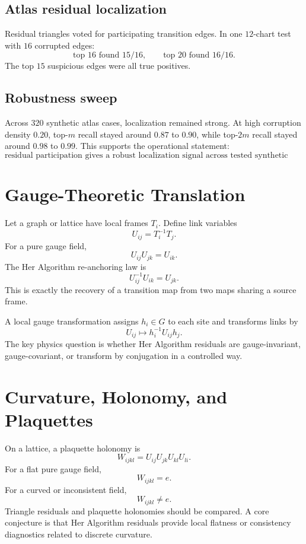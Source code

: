 \documentclass[11pt]{article}
\newcommand{\HA}{Her Algorithm}
\begin{document}
\subsection{Atlas residual localization}
Residual triangles voted for participating transition edges. In one \(12\)-chart test with \(16\) corrupted edges:
\[
\text{top }16\text{ found }15/16,\qquad \text{top }20\text{ found }16/16.
\]
The top \(15\) suspicious edges were all true positives.

\subsection{Robustness sweep}
Across \(320\) synthetic atlas cases, localization remained strong. At high corruption density \(0.20\), top-\(m\) recall stayed around \(0.87\) to \(0.90\), while top-\(2m\) recall stayed around \(0.98\) to \(0.99\). This supports the operational statement:
\[
\boxed{\text{residual participation gives a robust localization signal across tested synthetic atlas regimes.}}
\]

\section{Gauge-Theoretic Translation}

Let a graph or lattice have local frames \(T_i\). Define link variables
\[
U_{ij}=T_i^{-1}T_j.
\]
For a pure gauge field,
\[
U_{ij}U_{jk}=U_{ik}.
\]
The \HA{} re-anchoring law is
\[
U_{ij}^{-1}U_{ik}=U_{jk}.
\]
This is exactly the recovery of a transition map from two maps sharing a source frame.

A local gauge transformation assigns \(h_i\in G\) to each site and transforms links by
\[
U_{ij}\mapsto h_i^{-1}U_{ij}h_j.
\]
The key physics question is whether \HA{} residuals are gauge-invariant, gauge-covariant, or transform by conjugation in a controlled way.

\section{Curvature, Holonomy, and Plaquettes}

On a lattice, a plaquette holonomy is
\[
W_{ijkl}=U_{ij}U_{jk}U_{kl}U_{li}.
\]
For a flat pure gauge field,
\[
W_{ijkl}=e.
\]
For a curved or inconsistent field,
\[
W_{ijkl}\ne e.
\]
Triangle residuals and plaquette holonomies should be compared. A core conjecture is that \HA{} residuals provide local flatness or consistency diagnostics related to discrete curvature.
\end{document}
